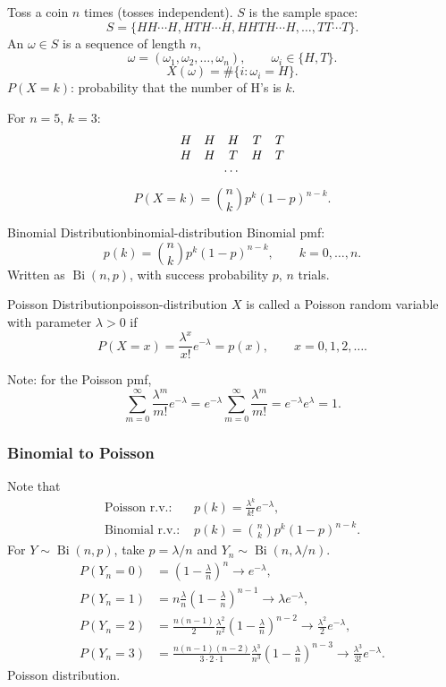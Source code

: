 \begin{example}
  Toss a coin $n$ times (tosses independent). $S$ is the sample space:
  \[
    S=\{HH\cdots H,HTH\cdots H,HHTH\cdots H,\ldots,TT\cdots T\}.
  \]
  An $\omega\in S$ is a sequence of length $n$,
  \[
    \omega=(\omega_1,\omega_2,\ldots,\omega_n),\qquad\omega_i\in\{H,T\}.
  \]
  \[
    X(\omega)=\#\{i:\omega_i=H\}.
  \]
  $P(X=k)$: probability that the number of H's is $k$.

  For $n=5$, $k=3$:
  \[
    \begin{array}{ccccc}
      H & H & H & T & T \\
      H & H & T & H & T \\
      \multicolumn{5}{c}{\cdots}
    \end{array}
  \]
  \[
    P(X=k)=\binom nk p^k(1-p)^{n-k}.
  \]
\end{example}

\begin{definition}{Binomial Distribution}{binomial-distribution}
  Binomial pmf:
  \[
    p(k)=\binom nk p^k(1-p)^{n-k},\qquad k=0,\ldots,n.
  \]
  Written as $\operatorname{Bi}(n,p)$, with success probability $p$, $n$ trials.
\end{definition}

\begin{definition}{Poisson Distribution}{poisson-distribution}
  $X$ is called a Poisson random variable with parameter $\lambda>0$ if
  \[
    P(X=x)=\frac{\lambda^x}{x!}e^{-\lambda}=p(x),\qquad x=0,1,2,\ldots.
  \]
\end{definition}

Note: for the Poisson pmf,
\[
  \sum_{m=0}^{\infty}\frac{\lambda^m}{m!}e^{-\lambda}
  =e^{-\lambda}\sum_{m=0}^{\infty}\frac{\lambda^m}{m!}
  =e^{-\lambda}e^\lambda=1.
\]

\subsubsection{Binomial to Poisson}

Note that
\begin{align*}
  \text{Poisson r.v.: }  & p(k)=\frac{\lambda^k}{k!}e^{-\lambda}, \\
  \text{Binomial r.v.: } & p(k)=\binom nk p^k(1-p)^{n-k}.
\end{align*}
For $Y\sim\operatorname{Bi}(n,p)$, take $p=\lambda/n$ and
$Y_n\sim\operatorname{Bi}(n,\lambda/n)$.
\begin{align*}
  P(Y_n=0) & =\left(1-\frac\lambda n\right)^n\to e^{-\lambda},           \\
  P(Y_n=1) & =n\frac\lambda n\left(1-\frac\lambda n\right)^{n-1}
  \to\lambda e^{-\lambda},                                               \\
  P(Y_n=2) & =\frac{n(n-1)}2\frac{\lambda^2}{n^2}
  \left(1-\frac\lambda n\right)^{n-2}\to\frac{\lambda^2}{2}e^{-\lambda}, \\
  P(Y_n=3) & =\frac{n(n-1)(n-2)}{3\cdot2\cdot1}\frac{\lambda^3}{n^3}
  \left(1-\frac\lambda n\right)^{n-3}\to\frac{\lambda^3}{3!}e^{-\lambda}.
\end{align*}
Poisson distribution.

